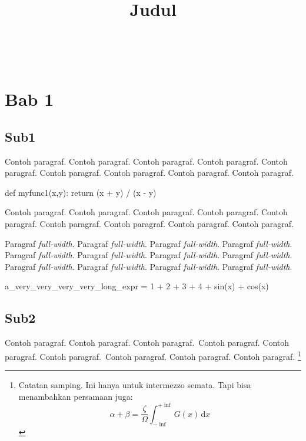 \documentclass[twoside,bahasa]{tufte-book}
\title{Judul}
\author{\noindent{Fadjar Fathurrahman} \\[3mm]
\noindent{Mariya Al Qibtiya Nasution} \\[3mm]}
\begin{document}
\maketitle

\chapter{Bab 1}

\section{Sub1}

Contoh paragraf. Contoh paragraf. Contoh paragraf. Contoh paragraf.
Contoh paragraf. Contoh paragraf. Contoh paragraf. Contoh paragraf.
Contoh paragraf.

\begin{pythoncode}
def myfunc1(x,y):
    return (x + y) / (x - y)
\end{pythoncode}

Contoh paragraf. Contoh paragraf. Contoh paragraf. Contoh paragraf.
Contoh paragraf. Contoh paragraf. Contoh paragraf. Contoh paragraf.
Contoh paragraf.

\begin{fullwidth}
Paragraf \emph{full-width}. Paragraf \emph{full-width}. Paragraf \emph{full-width}.
Paragraf \emph{full-width}. Paragraf \emph{full-width}. Paragraf \emph{full-width}.
Paragraf \emph{full-width}. Paragraf \emph{full-width}. Paragraf \emph{full-width}.
Paragraf \emph{full-width}. Paragraf \emph{full-width}. Paragraf \emph{full-width}.
\end{fullwidth}


\begin{fullwidth}
\begin{pythoncode}
a_very_very_very_very_long_expr = 1 + 2 + 3 + 4 + sin(x) + cos(x)
\end{pythoncode}
\end{fullwidth}

\section{Sub2}

Contoh paragraf. Contoh paragraf. Contoh paragraf.~Contoh paragraf.
Contoh paragraf. Contoh paragraf.~Contoh paragraf. Contoh paragraf.
Contoh paragraf.
\footnote{Catatan samping. Ini hanya untuk
intermezzo semata. Tapi bisa menambahkan persamaan juga:
\begin{equation}
\alpha + \beta = \frac{\zeta}{\Omega} \int_{-\inf}^{+\inf} G(x)\,\mathrm{d}x
\end{equation}
}
\end{document}
